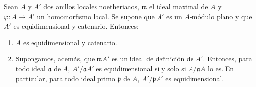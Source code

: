 \begin{proposition}[7.1.3]
\label{IV.2.s7.1.3-fr}
Sean $A$ y $A'$ dos anillos locales noetherianos,
$\mathfrak m$ el ideal maximal de $A$ y
$\varphi:A\to A'$ un homomorfismo local. Se supone
que $A'$ es un $A$-módulo plano y que $A'$ es
equidimensional y catenario. Entonces:
\begin{enumerate}
\item[\textup{(i)}] $A$ es equidimensional y catenario.
\item[\textup{(ii)}] Supongamos, además, que $\mathfrak mA'$ es
un ideal de definición de $A'$. Entonces, para todo
ideal $\mathfrak a$ de $A$, $A'/\mathfrak aA'$ es
equidimensional si y solo si $A/\mathfrak aA$ lo es.
En particular, para todo ideal primo $\mathfrak p$
de $A$, $A'/\mathfrak pA'$ es equidimensional.
\end{enumerate}
\end{proposition}


